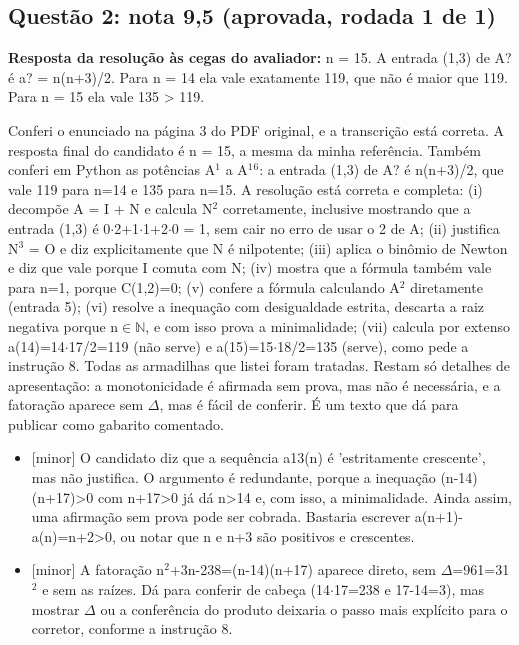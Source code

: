 \documentclass{article}%
\begin{document}
\subsection*{Questão 2: nota 9,5 (aprovada, rodada 1 de 1)}%
\textbf{Resposta da resolução às cegas do avaliador:} n = 15. A entrada (1,3) de A? é a? = n(n+3)/2. Para n = 14 ela vale exatamente 119, que não é maior que 119. Para n = 15 ela vale 135 > 119.\par %
Conferi o enunciado na página 3 do PDF original, e a transcrição está correta. A resposta final do candidato é n = 15, a mesma da minha referência. Também conferi em Python as potências A$^{1}$ a A$^{1}$$^{6}$: a entrada (1,3) de A? é n(n+3)/2, que vale 119 para n=14 e 135 para n=15. A resolução está correta e completa:\newline%
(i) decompõe A = I + N e calcula N$^2$ corretamente, inclusive mostrando que a entrada (1,3) é 0$\cdot$2+1$\cdot$1+2$\cdot$0 = 1, sem cair no erro de usar o 2 de A;\newline%
(ii) justifica N$^3$ = O e diz explicitamente que N é nilpotente;\newline%
(iii) aplica o binômio de Newton e diz que vale porque I comuta com N;\newline%
(iv) mostra que a fórmula também vale para n=1, porque C(1,2)=0;\newline%
(v) confere a fórmula calculando A$^2$ diretamente (entrada 5);\newline%
(vi) resolve a inequação com desigualdade estrita, descarta a raiz negativa porque n$\in$$\mathbb{N}$, e com isso prova a minimalidade;\newline%
(vii) calcula por extenso a(14)=14$\cdot$17/2=119 (não serve) e a(15)=15$\cdot$18/2=135 (serve), como pede a instrução 8.\newline%
Todas as armadilhas que listei foram tratadas. Restam só detalhes de apresentação: a monotonicidade é afirmada sem prova, mas não é necessária, e a fatoração aparece sem $\Delta$, mas é fácil de conferir. É um texto que dá para publicar como gabarito comentado.%
\begin{itemize}%
\item%
{[}minor{]} O candidato diz que a sequência a13(n) é 'estritamente crescente', mas não justifica. O argumento é redundante, porque a inequação (n-14)(n+17)>0 com n+17>0 já dá n>14 e, com isso, a minimalidade. Ainda assim, uma afirmação sem prova pode ser cobrada. Bastaria escrever a(n+1)-a(n)=n+2>0, ou notar que n e n+3 são positivos e crescentes.%
\item%
{[}minor{]} A fatoração n$^2$+3n-238=(n-14)(n+17) aparece direto, sem $\Delta$=961=31$^2$ e sem as raízes. Dá para conferir de cabeça (14$\cdot$17=238 e 17-14=3), mas mostrar $\Delta$ ou a conferência do produto deixaria o passo mais explícito para o corretor, conforme a instrução 8.%
\end{itemize}%
\end{document}
